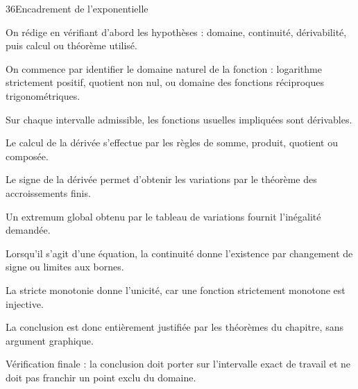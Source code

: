 \documentclass[11pt,a4paper]{article}
\begin{document}
\begin{corrbox}{36}{Encadrement de l'exponentielle}

\begin{methodebox}
On rédige en vérifiant d'abord les hypothèses : domaine, continuité, dérivabilité, puis calcul ou théorème utilisé.
\end{methodebox}

On commence par identifier le domaine naturel de la fonction : logarithme strictement positif, quotient non nul, ou domaine des fonctions réciproques trigonométriques.


Sur chaque intervalle admissible, les fonctions usuelles impliquées sont dérivables.


Le calcul de la dérivée s'effectue par les règles de somme, produit, quotient ou composée.


Le signe de la dérivée permet d'obtenir les variations par le théorème des accroissements finis.


Un extremum global obtenu par le tableau de variations fournit l'inégalité demandée.


Lorsqu'il s'agit d'une équation, la continuité donne l'existence par changement de signe ou limites aux bornes.


La stricte monotonie donne l'unicité, car une fonction strictement monotone est injective.


La conclusion est donc entièrement justifiée par les théorèmes du chapitre, sans argument graphique.


\begin{attentionbox}
Vérification finale : la conclusion doit porter sur l'intervalle exact de travail et ne doit pas franchir un point exclu du domaine.
\end{attentionbox}

\end{corrbox}
\end{document}
